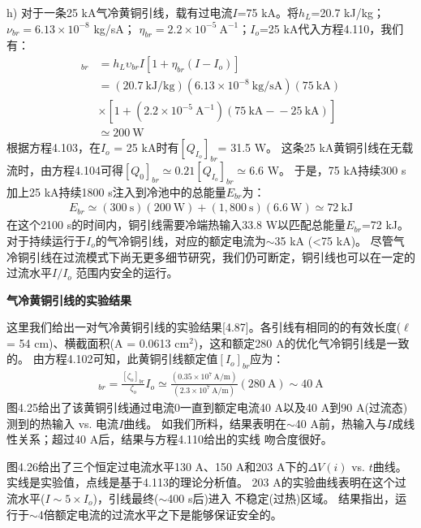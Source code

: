 h) 对于一条25 kA气冷黄铜引线，载有过电流$I$=75 kA。将$h_L$=20.7 kJ/kg；$\nu_{br}=6.13\times 10^{-8}$ kg/sA；
$\eta_{br}=2.2\times 10^{-5}\ \mathrm{A^{-1}}$；$I_o$=25 kA代入方程4.110，我们有：
\begin{align*}%
[Q_{I_o}]_{br}&=h_L\upsilon_{br}I[1+\eta_{br}(I-I_o)] \\ \tag{4.110}
&=(20.7\ \mathrm{kJ/kg})(6.13\times 10^{-8}\ \mathrm{kg/sA})(75\ \mathrm{kA}) \\
&\times[1+(2.2\times 10^{-5}\ \mathrm{A^{-1}})(75\ \mathrm{kA-}-25\ \mathrm{kA})]\\
&\simeq 200\ \mathrm{W}
\end{align*}
根据方程4.103，在$I_o$ = 25 kA时有$[Q_{I_o}]_{br}$= 31.5 W。
这条25 kA黄铜引线在无载流时，由方程4.104可得$[Q_0]_{br}\simeq 0.21[Q_{I_o}]_{br}\simeq$6.6 W。
于是，75 kA持续300 s加上25 kA持续1800 s注入到冷池中的总能量$E_{br}$为：
\begin{align*}
E_{br}\simeq(300\ \mathrm{s})(200\ \mathrm{W})+(1,800\ \mathrm{s})(6.6\ \mathrm{W}) 
\simeq 72\ \mathrm{kJ} \tag{S7.10}
\end{align*}
在这个2100 s的时间内，铜引线需要冷端热输入33.8 W以匹配总能量$E_{br}$=72 kJ。
对于持续运行于$I_o$的气冷铜引线，对应的额定电流为$\sim$35 kA (<75 kA)。
尽管气冷铜引线在过流模式下尚无更多细节研究，我们仍可断定，铜引线也可以在一定的过流水平$I/I_o$
范围内安全的运行。


\textbf{气冷黄铜引线的实验结果}

这里我们给出一对气冷黄铜引线的实验结果[4.87]。各引线有相同的的有效长度($\ell$= 54 cm)、横截面积(A =
0.0613 $\mathrm{cm^2}$)，这和额定280 A的优化气冷铜引线是一致的。
由方程4.102可知，此黄铜引线额定值$[I_o]_{br}$应为：
\begin{align*}
[I_o]_{br}=\frac{[\zeta_o]_{br}}{\zeta_o}I_o 
\simeq\frac{(0.35\times 10^7\ \mathrm{A/m})}{(2.3\times 10^7\ \mathrm{A/m})}(280\ \mathrm{A})\sim 40\ \mathrm{A}
\end{align*}
图4.25给出了该黄铜引线通过电流0一直到额定电流40 A以及40 A到90 A(过流态)测到的热输入 vs. 电流$I$曲线。
如我们所料，结果表明在$\sim$40 A前，热输入与$I$成线性关系；超过40 A后，结果与方程4.110给出的实线
吻合度很好。

图4.26给出了三个恒定过电流水平130 A、150 A和203 A下的$\Delta V(i)$ vs. $t$曲线。
实线是实验值，点线是基于4.113的理论分析值。
203 A的实验曲线表明在这个过流水平($I\sim 5\times I_o$)，引线最终($\sim$400 s后)进入
不稳定(过热)区域。
结果指出，运行于$\sim$4倍额定电流的过流水平之下是能够保证安全的。

